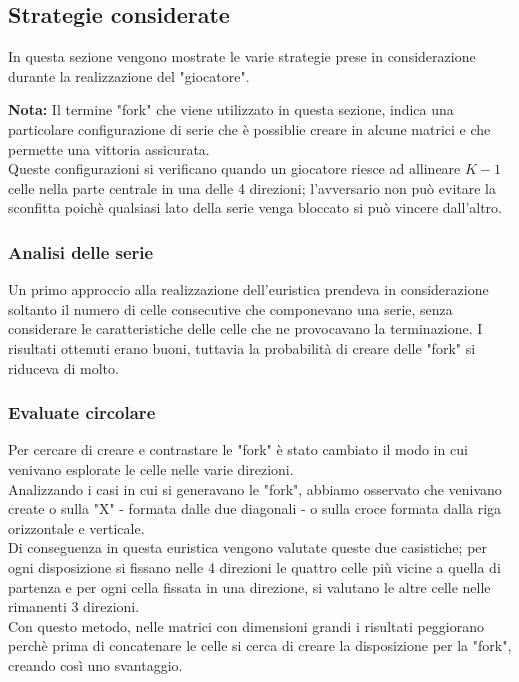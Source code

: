 \subsection{Strategie considerate}
In questa sezione vengono mostrate le varie strategie prese in considerazione durante la realizzazione del "giocatore".

\textbf{Nota:} Il termine "fork" che viene utilizzato in questa sezione, indica una particolare configurazione di serie che è possiblie creare in alcune matrici e che permette una vittoria assicurata.\\
Queste configurazioni si verificano quando un giocatore riesce ad allineare $ K - 1 $ celle nella parte centrale in una delle 4 direzioni; l'avversario non può evitare la sconfitta poichè qualsiasi lato della serie venga bloccato si può vincere dall'altro.

\subsubsection{Analisi delle serie}
Un primo approccio alla realizzazione dell'euristica prendeva in considerazione soltanto il numero di celle consecutive che componevano una serie, senza considerare le caratteristiche delle celle che ne provocavano la terminazione. I risultati ottenuti erano buoni, tuttavia la probabilità di creare delle "fork" si riduceva di molto.

\subsubsection{Evaluate circolare}
Per cercare di creare e contrastare le "fork" è stato cambiato il modo in cui venivano esplorate le celle nelle varie direzioni.\\
Analizzando i casi in cui si generavano le "fork", abbiamo osservato che venivano create o sulla "X" - formata dalle due diagonali - o sulla croce formata dalla riga orizzontale e verticale.\\
Di conseguenza in questa euristica vengono valutate queste due casistiche; per ogni disposizione si fissano nelle 4 direzioni le quattro celle più vicine a quella di partenza e per ogni cella fissata in una direzione, si valutano le altre celle nelle rimanenti 3 direzioni.\\
Con questo metodo, nelle matrici con dimensioni grandi i risultati peggiorano perchè prima di concatenare le celle si cerca di creare la disposizione per la "fork", creando così uno svantaggio.
